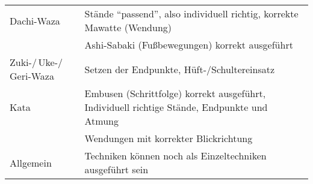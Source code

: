 	\null\vfill\null
	{\small\begin{tabularx}{\textwidth}{ll}
		\midrule
		Dachi-Waza					& Stände \textquotedblleft passend\textquotedblright , also individuell richtig, korrekte Mawatte (Wendung) \\
		& Ashi-Sabaki (Fußbewegungen) korrekt ausgeführt \\
		Zuki-/\,Uke-/\,Geri-Waza	& Setzen der Endpunkte, Hüft-/Schultereinsatz \\
		Kata						& Embusen (Schrittfolge) korrekt ausgeführt, Individuell richtige Stände, Endpunkte und Atmung \\
		& Wendungen mit korrekter Blickrichtung \\
		Allgemein					& Techniken können noch als Einzeltechniken ausgeführt sein \\
		\midrule
	\end{tabularx}}\null\vfill\null